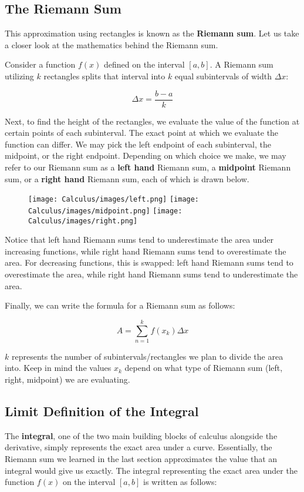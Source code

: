 \documentclass[11pt]{article}
\begin{document}
\subsection{The Riemann Sum}
This approximation using rectangles is known as the \textbf{Riemann sum}. Let us take a closer look at the mathematics behind the Riemann sum.

Consider a function $f(x)$ defined on the interval $[a, b]$. A Riemann sum utilizing $k$ rectangles splits that interval into $k$ equal subintervals of width $\Delta x$:

\[\Delta x = \frac{b-a}{k} \]

Next, to find the height of the rectangles, we evaluate the value of the function at certain points of each subinterval. The exact point at which we evaluate the function can differ. We may pick the left endpoint of each subinterval, the midpoint, or the right endpoint. Depending on which choice we make, we may refer to our Riemann sum as a \textbf{left hand} Riemann sum, a \textbf{midpoint} Riemann sum, or a \textbf{right hand} Riemann sum, each of which is drawn below.

\begin{figure}[H]
    \texttt{[image: Calculus/images/left.png]}
    \texttt{[image: Calculus/images/midpoint.png]}
    \texttt{[image: Calculus/images/right.png]}
\end{figure}

Notice that left hand Riemann sums tend to underestimate the area under increasing functions, while right hand Riemann sums tend to overestimate the area. For decreasing functions, this is swapped: left hand Riemann sums tend to overestimate the area, while right hand Riemann sums tend to underestimate the area.

Finally, we can write the formula for a Riemann sum as follows:

\[ A = \sum_{n=1}^{k} f(x_k) \Delta x \]

$k$ represents the number of subintervals/rectangles we plan to divide the area into. Keep in mind the values $x_k$ depend on what type of Riemann sum (left, right, midpoint) we are evaluating.

\subsection{Limit Definition of the Integral}
The \textbf{integral}, one of the two main building blocks of calculus alongside the derivative, simply represents the exact area under a curve. Essentially, the Riemann sum we learned in the last section approximates the value that an integral would give us exactly. The integral representing the exact area under the function $f(x)$ on the interval $[a, b]$ is written as follows:
\end{document}
